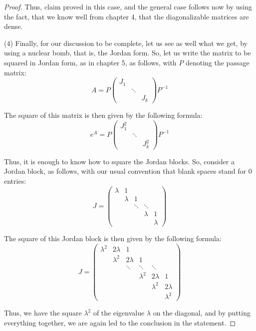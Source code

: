 \documentclass[10pt,a4paper]{amsart}
\begin{document}
\begin{proof}
Thus, claim proved in this case, and the general case follows now by using the fact, that we know well from chapter 4, that the diagonalizable matrices are dense.

\medskip

(4) Finally, for our discussion to be complete, let us see as well what we get, by using a nuclear bomb, that is, the Jordan form. So, let us write the matrix to be squared in Jordan form, as in chapter 5, as follows, with $P$ denoting the passage matrix:
$$A=P\begin{pmatrix}
J_1\\
&\ddots\\
&&J_k
\end{pmatrix}P^{-1}$$

The square of this matrix is then given by the following formula:
$$e^A=P\begin{pmatrix}
J_1^2\\
&\ddots\\
&&J_k^2
\end{pmatrix}P^{-1}$$

Thus, it is enough to know how to square the Jordan blocks. So, consider a Jordan block, as follows, with our usual convention that blank spaces stand for $0$ entries:
$$J=\begin{pmatrix}
\lambda&1\\
&\lambda&1\\
&&\ddots&\ddots\\
&&&\lambda&1\\
&&&&\lambda
\end{pmatrix}$$

The square of this Jordan block is then given by the following formula:
$$J=\begin{pmatrix}
\lambda^2&2\lambda&1\\
&\lambda^2&2\lambda&1\\
&&\ddots&\ddots&\ddots\\
&&&\lambda^2&2\lambda&1\\
&&&&\lambda^2&2\lambda\\
&&&&&\lambda^2
\end{pmatrix}$$

Thus, we have the square $\lambda^2$ of the eigenvalue $\lambda$ on the diagonal, and by putting everything together, we are again led to the conclusion in the statement.
\end{proof}
\end{document}
